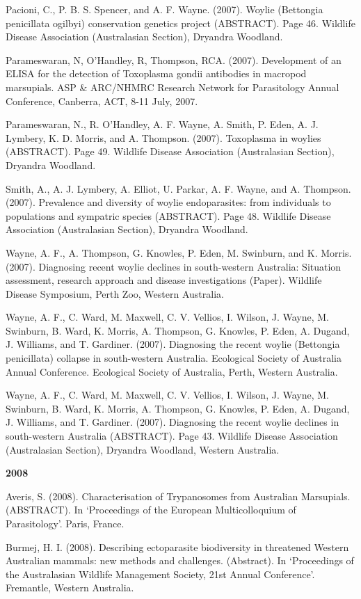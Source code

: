 \documentclass[version=last,
    paper=a4,                               %
    10pt,                                   %
    dvipsnames,
    oneside,                              %
    headings=openany,                       %
    open=any,
    BCOR=7mm,                               %
    DIV=15,     %
]{scrbook}
\begin{document}
Pacioni, C., P. B. S. Spencer, and A. F. Wayne. (2007). Woylie
(Bettongia penicillata ogilbyi) conservation genetics project
(ABSTRACT). Page 46. Wildlife Disease Association (Australasian
Section), Dryandra Woodland.

Parameswaran, N, O'Handley, R, Thompson, RCA. (2007). Development of an
ELISA for the detection of Toxoplasma gondii antibodies in macropod
marsupials. ASP \& ARC/NHMRC Research Network for Parasitology Annual
Conference, Canberra, ACT, 8-11 July, 2007.

Parameswaran, N., R. O'Handley, A. F. Wayne, A. Smith, P. Eden, A. J.
Lymbery, K. D. Morris, and A. Thompson. (2007). Toxoplasma in woylies
(ABSTRACT). Page 49. Wildlife Disease Association (Australasian
Section), Dryandra Woodland.

Smith, A., A. J. Lymbery, A. Elliot, U. Parkar, A. F. Wayne, and A.
Thompson. (2007). Prevalence and diversity of woylie endoparasites: from
individuals to populations and sympatric species (ABSTRACT). Page 48.
Wildlife Disease Association (Australasian Section), Dryandra Woodland.

Wayne, A. F., A. Thompson, G. Knowles, P. Eden, M. Swinburn, and K.
Morris. (2007). Diagnosing recent woylie declines in south-western
Australia: Situation assessment, research approach and disease
investigations (Paper). Wildlife Disease Symposium, Perth Zoo, Western
Australia.

Wayne, A. F., C. Ward, M. Maxwell, C. V. Vellios, I. Wilson, J. Wayne,
M. Swinburn, B. Ward, K. Morris, A. Thompson, G. Knowles, P. Eden, A.
Dugand, J. Williams, and T. Gardiner. (2007). Diagnosing the recent
woylie (Bettongia penicillata) collapse in south-western Australia.
Ecological Society of Australia Annual Conference. Ecological Society of
Australia, Perth, Western Australia.

Wayne, A. F., C. Ward, M. Maxwell, C. V. Vellios, I. Wilson, J. Wayne,
M. Swinburn, B. Ward, K. Morris, A. Thompson, G. Knowles, P. Eden, A.
Dugand, J. Williams, and T. Gardiner. (2007). Diagnosing the recent
woylie declines in south-western Australia (ABSTRACT). Page 43. Wildlife
Disease Association (Australasian Section), Dryandra Woodland, Western
Australia.

\textbf{2008}

Averis, S. (2008). Characterisation of Trypanosomes from Australian
Marsupials. (ABSTRACT). In `Proceedings of the European Multicolloquium
of Parasitology'. Paris, France.

Burmej, H. I. (2008). Describing ectoparasite biodiversity in threatened
Western Australian mammals: new methods and challenges. (Abstract). In
`Proceedings of the Australasian Wildlife Management Society, 21st
Annual Conference'. Fremantle, Western Australia.
\end{document}
